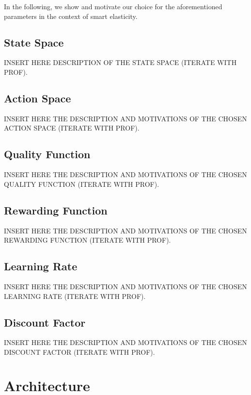 In the following, we show and motivate our choice for the aforementioned parameters in the context of smart elasticity.


\subsection{State Space}
\label{sec:smart-elasticity-elasticity-leveraging-q-learning-state-space}
INSERT HERE DESCRIPTION OF THE STATE SPACE (ITERATE WITH PROF).


\subsection{Action Space}
\label{sec:smart-elasticity-elasticity-leveraging-q-learning-action-space}
INSERT HERE THE DESCRIPTION AND MOTIVATIONS OF THE CHOSEN ACTION SPACE (ITERATE WITH PROF).


\subsection{Quality Function}
\label{sec:smart-elasticity-elasticity-leveraging-q-learning-quality-function}
INSERT HERE THE DESCRIPTION AND MOTIVATIONS OF THE CHOSEN QUALITY FUNCTION (ITERATE WITH PROF).


\subsection{Rewarding Function}
\label{sec:smart-elasticity-elasticity-leveraging-q-learning-rewarding-function}
INSERT HERE THE DESCRIPTION AND MOTIVATIONS OF THE CHOSEN REWARDING FUNCTION (ITERATE WITH PROF).


\subsection{Learning Rate}
\label{sec:smart-elasticity-elasticity-leveraging-q-learning-learning-rate}
INSERT HERE THE DESCRIPTION AND MOTIVATIONS OF THE CHOSEN LEARNING RATE (ITERATE WITH PROF).


\subsection{Discount Factor}
\label{sec:smart-elasticity-elasticity-leveraging-q-learning-discount-factor}
INSERT HERE THE DESCRIPTION AND MOTIVATIONS OF THE CHOSEN DISCOUNT FACTOR (ITERATE WITH PROF).


\section{Architecture}
\label{sec:implementation-architecture}

